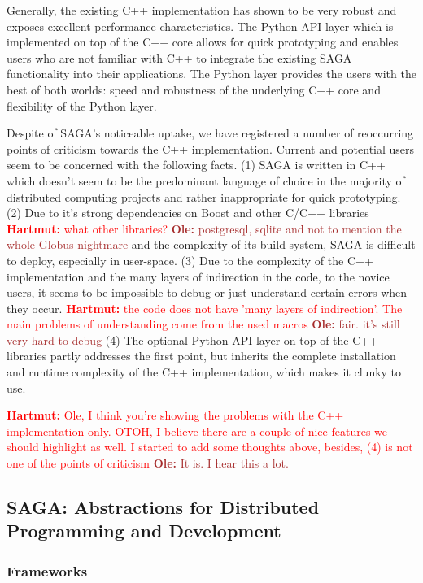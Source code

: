 \documentclass{article}
\newcommand{\B}[1]{\textbf{#1}}
\newcommand{\ownote}[1]{{\textcolor{Brown}{   \B{Ole:     } #1 }}}
\newcommand{\hknote}[1]{{\textcolor{red}{  \B{Hartmut: } #1 }}}
\newcommand{\ownote}[1]{}
\newcommand{\hknote}[1]{}
\begin{document}
Generally, the existing C++ implementation has shown to be very robust and exposes excellent
performance characteristics. The Python API layer which is implemented on top of the
C++ core allows for quick prototyping and enables users who are not familiar with C++
to integrate the existing SAGA functionality into their applications. The Python layer provides 
the users with the best of both worlds: speed and robustness of the underlying C++ core and 
flexibility of the Python layer.

Despite of SAGA's noticeable uptake, we have registered a number of  reoccurring  
points of criticism towards the C++ implementation. Current and potential users seem to 
be concerned with the following facts. (1) SAGA is written in C++ which doesn't seem to be 
the predominant language of choice in the majority of distributed computing projects and 
rather inappropriate for quick prototyping. (2) Due to it's strong dependencies on Boost 
and other C/C++ libraries \hknote{what other libraries?} \ownote{postgresql, sqlite and not to mention the whole Globus nightmare} and the complexity of its build system, SAGA is difficult to deploy, 
especially in user-space. (3) Due to the complexity of the C++ implementation and the many 
layers of indirection in the code, to the novice users, it seems to be impossible to debug or 
just understand certain errors when they occur. \hknote{the code does not have 'many layers of indirection'. The main problems of understanding come from the used macros} \ownote{fair. it's still very hard to debug}
(4) The optional Python API layer on top of the C++ libraries partly addresses the first point, but inherits the complete installation and 
runtime complexity of the C++ implementation, which makes it clunky to use.

\hknote{Ole, I think you're showing the problems with the C++ implementation only. OTOH, I believe 
there are a couple of nice features we should highlight as well. I started to add some thoughts above, besides, 
(4) is not one of the points of criticism} \ownote{It is. I hear this a lot.}

\subsection{SAGA: Abstractions for Distributed Programming and
  Development}

\subsubsection{Frameworks}
\end{document}
